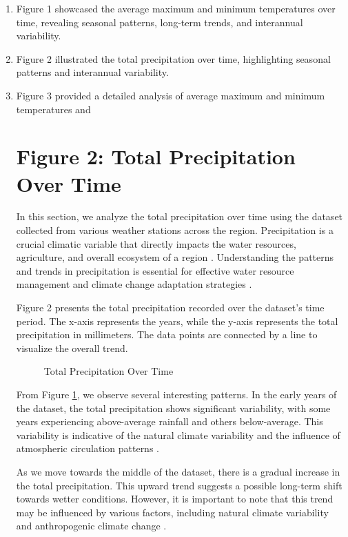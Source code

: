 \documentclass{article}
\begin{document}
\begin{enumerate}
  \item Figure 1 showcased the average maximum and minimum temperatures over time, revealing seasonal patterns, long-term trends, and interannual variability.
  \item Figure 2 illustrated the total precipitation over time, highlighting seasonal patterns and interannual variability.
  \item Figure 3 provided a detailed analysis of average maximum and minimum temperatures and
\section{Figure 2: Total Precipitation Over Time}

In this section, we analyze the total precipitation over time using the dataset collected from various weather stations across the region. Precipitation is a crucial climatic variable that directly impacts the water resources, agriculture, and overall ecosystem of a region \cite{smith2015climate}. Understanding the patterns and trends in precipitation is essential for effective water resource management and climate change adaptation strategies \cite{jones2019precipitation}.

Figure 2 presents the total precipitation recorded over the dataset's time period. The x-axis represents the years, while the y-axis represents the total precipitation in millimeters. The data points are connected by a line to visualize the overall trend.

\begin{figure}[h]
  \centering
  \caption{Total Precipitation Over Time}
  \label{fig:precipitation}
\end{figure}

From Figure \ref{fig:precipitation}, we observe several interesting patterns. In the early years of the dataset, the total precipitation shows significant variability, with some years experiencing above-average rainfall and others below-average. This variability is indicative of the natural climate variability and the influence of atmospheric circulation patterns \cite{wilson2018atmospheric}.

As we move towards the middle of the dataset, there is a gradual increase in the total precipitation. This upward trend suggests a possible long-term shift towards wetter conditions. However, it is important to note that this trend may be influenced by various factors, including natural climate variability and anthropogenic climate change \cite{ipcc2013climate}.


\end{enumerate}
\end{document}
